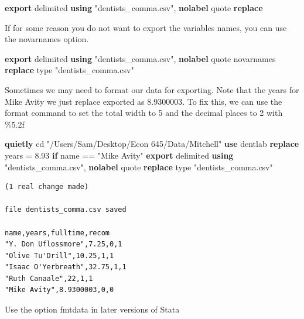 \documentclass[
]{book}
\newenvironment{Shaded}{\begin{snugshade}}{\end{snugshade}}
\newcommand{\BaseNTok}[1]{\textcolor[rgb]{0.00,0.00,0.81}{#1}}
\newcommand{\DecValTok}[1]{\textcolor[rgb]{0.00,0.00,0.81}{#1}}
\newcommand{\KeywordTok}[1]{\textcolor[rgb]{0.13,0.29,0.53}{\textbf{#1}}}
\newcommand{\NormalTok}[1]{#1}
\newcommand{\StringTok}[1]{\textcolor[rgb]{0.31,0.60,0.02}{#1}}
\begin{document}
\begin{Shaded}
\begin{Highlighting}[]
\KeywordTok{export}\NormalTok{ delimited }\KeywordTok{using} \StringTok{"dentists\_comma.csv"}\NormalTok{, }\KeywordTok{nolabel}\NormalTok{ quote }\KeywordTok{replace}
\end{Highlighting}
\end{Shaded}

If for some reason you do not want to export the variables names, you can use
the novarnames option.

\begin{Shaded}
\begin{Highlighting}[]
\KeywordTok{export}\NormalTok{ delimited }\KeywordTok{using} \StringTok{"dentists\_comma.csv"}\NormalTok{, }\KeywordTok{nolabel}\NormalTok{ quote novarnames }\KeywordTok{replace}
\DecValTok{type} \StringTok{"dentists\_comma.csv"}
\end{Highlighting}
\end{Shaded}

Sometimes we may need to format our data for exporting. Note that the years for Mike Avity we just replace exported as 8.9300003. To fix this, we can use the format command to set the total width to 5 and the decimal places to 2 with \%5.2f

\begin{Shaded}
\begin{Highlighting}[]
\KeywordTok{quietly}\NormalTok{ cd }\StringTok{"/Users/Sam/Desktop/Econ 645/Data/Mitchell"}
\KeywordTok{use}\NormalTok{ dentlab}
\KeywordTok{replace}\NormalTok{ years = 8.93 }\KeywordTok{if} \BaseNTok{name}\NormalTok{ == }\StringTok{"Mike Avity"}
\KeywordTok{export}\NormalTok{ delimited }\KeywordTok{using} \StringTok{"dentists\_comma.csv"}\NormalTok{, }\KeywordTok{nolabel}\NormalTok{ quote }\KeywordTok{replace}
\DecValTok{type} \StringTok{"dentists\_comma.csv"}
\end{Highlighting}
\end{Shaded}

\begin{verbatim}
(1 real change made)

file dentists_comma.csv saved

name,years,fulltime,recom
"Y. Don Uflossmore",7.25,0,1
"Olive Tu'Drill",10.25,1,1
"Isaac O'Yerbreath",32.75,1,1
"Ruth Canaale",22,1,1
"Mike Avity",8.9300003,0,0
\end{verbatim}

Use the option fmtdata in later versions of Stata
\end{document}
